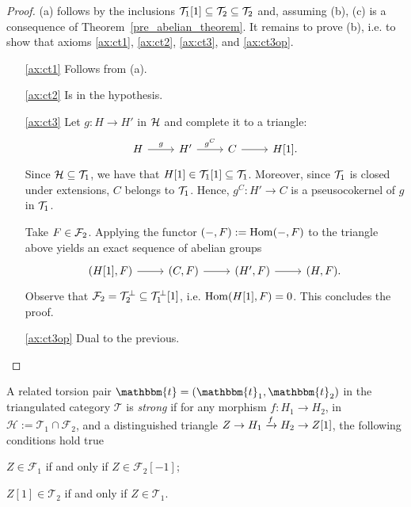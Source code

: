 \begin{proof}
  (a) follows by the inclusions $\mathcal{T}_1[1]\subseteq \mathcal{T}_2\subseteq \mathcal{T}_2$ and, assuming (b), (c) is a consequence of Theorem~\ref{pre_abelian_theorem}. It remains to prove (b), i.e. to show that axioms \ref{ax:ct1}, \ref{ax:ct2}, \ref{ax:ct3}, and \ref{ax:ct3op}.

  \begin{itemize}
    \item[\ref{ax:ct1}] Follows from (a).
    \item[\ref{ax:ct2}] Is in the hypothesis.
    \item[\ref{ax:ct3}] Let $g:H\to H'$ in $\mathcal{H}$ and complete it to a triangle:
      \begin{equation*}
        \begin{tikzcd}
          H\arrow{r}{g}&H'\arrow{r}{g^C}&C\arrow{r}&H[1].
        \end{tikzcd}
      \end{equation*}
      Since $\mathcal{H}\subseteq \mathcal{T}_1$, we have that $H[1]\in\mathcal{T}_1[1]\subseteq \mathcal{T}_1$. Moreover, since $\mathcal{T}_1$ is closed under extensions, $C$ belongs to $\mathcal{T}_1$. Hence, $g^C:H'\to C$ is a pseusocokernel of $g$ in $\mathcal{T}_1$.

      Take $F\in\mathcal{F}_2$. Applying the functor $(-,F):=\operatorname{Hom}(-,F)$ to the triangle above yields an exact sequence of abelian groups
      \begin{equation*}
        \begin{tikzcd}
          (H[1],F)\arrow{r}&(C,F)\arrow{r}&(H',F)\arrow{r}&(H,F).
        \end{tikzcd}
      \end{equation*}
      Observe that $\mathcal{F}_2=\mathcal{T}_2^\perp \subseteq \mathcal{T}_1^\perp[1]$, i.e. $\operatorname{Hom}(H[1],F)=0$. This concludes the proof.
    \item[\ref{ax:ct3op}] Dual to the previous.
  \end{itemize}
\end{proof}

\begin{definition}
  A related torsion pair $\mathbbm{t}=(\mathbbm{t}_1,\mathbbm{t}_2)$ in the triangulated category
  $\mathcal{T}$ is \emph{strong} if for any morphism $f:H_1\to H_2$, in $\mathcal{H}:=\mathcal{T}_1\cap\mathcal{F}_2$,
  and a distinguished triangle $Z\to H_1\xrightarrow{f}H_2\to Z[1]$, the following conditions
  hold true
  \begin{relatedtorsion}
    \item $Z\in\mathcal{F}_1$ if and only if $Z\in\mathcal{F}_2[-1]$;
    \item $Z[1]\in\mathcal{T}_2$ if and only if $Z\in\mathcal{T}_1$.
  \end{relatedtorsion}
\end{definition}

